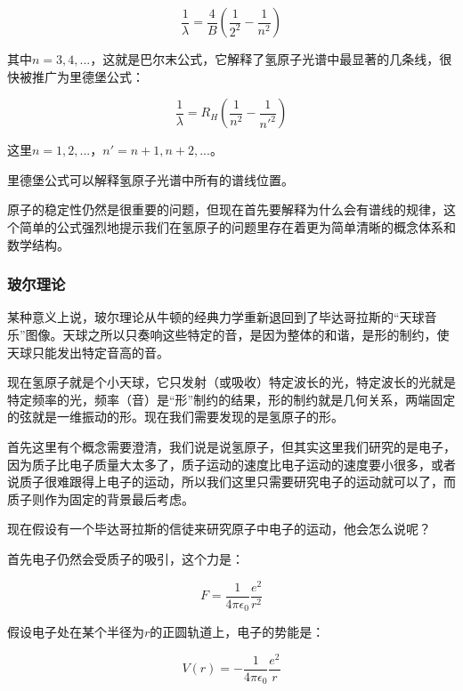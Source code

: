 \begin{equation}
\frac{1}{\lambda} = \frac{4}{B} \left( \frac{1}{2^2} - \frac{1}{n^2} \right)
\end{equation}

其中$n = 3, 4, ...$，这就是巴尔末公式，它解释了氢原子光谱中最显著的几条线，很快被推广为里德堡公式：

\begin{equation}
\frac{1}{\lambda} = R_H \left(  \frac{1}{n^2} - \frac{1}{n'^2}  \right)
\end{equation}

这里$n = 1,  2, ...$，$n' = n+1, n+2, ...$。

里德堡公式可以解释氢原子光谱中所有的谱线位置。

原子的稳定性仍然是很重要的问题，但现在首先要解释为什么会有谱线的规律，这个简单的公式强烈地提示我们在氢原子的问题里存在着更为简单清晰的概念体系和数学结构。

\subsubsection{玻尔理论}


某种意义上说，玻尔理论从牛顿的经典力学重新退回到了毕达哥拉斯的“天球音乐”图像。天球之所以只奏响这些特定的音，是因为整体的和谐，是形的制约，使天球只能发出特定音高的音。

现在氢原子就是个小天球，它只发射（或吸收）特定波长的光，特定波长的光就是特定频率的光，频率（音）是“形”制约的结果，形的制约就是几何关系，两端固定的弦就是一维振动的形。现在我们需要发现的是氢原子的形。

首先这里有个概念需要澄清，我们说是说氢原子，但其实这里我们研究的是电子，因为质子比电子质量大太多了，质子运动的速度比电子运动的速度要小很多，或者说质子很难跟得上电子的运动，所以我们这里只需要研究电子的运动就可以了，而质子则作为固定的背景最后考虑。

现在假设有一个毕达哥拉斯的信徒来研究原子中电子的运动，他会怎么说呢？

首先电子仍然会受质子的吸引，这个力是：

\begin{equation}
F = \frac{1}{4 \pi \epsilon_0} \frac{e^2}{ r^2 }
\end{equation}

假设电子处在某个半径为$r$的正圆轨道上，电子的势能是：

\begin{equation}
V(r) = - \frac{1}{4 \pi \epsilon_0} \frac{e^2}{ r }
\end{equation}

